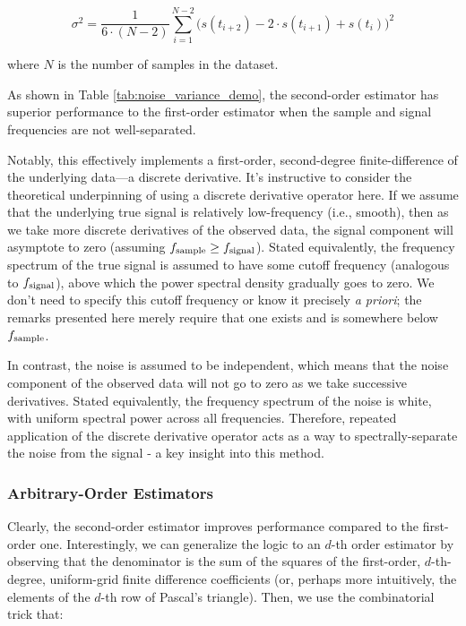 \documentclass[conf]{new-aiaa}
\begin{document}
    \begin{equation}
        \sigma^2 = \frac{1}{6 \cdot (N-2)} \sum_{i=1}^{N-2} \Big( s(t_{i+2}) - 2 \cdot s(t_{i+1}) + s(t_i) \Big)^2
        \label{eq:2nd_order_noise_estimator}
    \end{equation}

    \noindent where $N$ is the number of samples in the dataset.

    As shown in Table \ref{tab:noise_variance_demo}, the second-order estimator has superior performance to the first-order estimator when the sample and signal frequencies are not well-separated.

    Notably, this effectively implements a first-order, second-degree finite-difference of the underlying data—a discrete derivative. It's instructive to consider the theoretical underpinning of using a discrete derivative operator here. If we assume that the underlying true signal is relatively low-frequency (i.e., smooth), then as we take more discrete derivatives of the observed data, the signal component will asymptote to zero (assuming $f_{\rm sample} \geq f_{\rm signal}$). Stated equivalently, the frequency spectrum of the true signal is assumed to have some cutoff frequency (analogous to $f_{\rm signal}$), above which the power spectral density gradually goes to zero. We don't need to specify this cutoff frequency or know it precisely \emph{a priori}; the remarks presented here merely require that one exists and is somewhere below $f_{\rm sample}$.

    In contrast, the noise is assumed to be independent, which means that the noise component of the observed data will not go to zero as we take successive derivatives. Stated equivalently, the frequency spectrum of the noise is white, with uniform spectral power across all frequencies. Therefore, repeated application of the discrete derivative operator acts as a way to spectrally-separate the noise from the signal - a key insight into this method.

    \subsubsection{Arbitrary-Order Estimators}

    Clearly, the second-order estimator improves performance compared to the first-order one. Interestingly, we can generalize the logic to an $d$-th order estimator by observing that the denominator is the sum of the squares of the first-order, $d$-th-degree, uniform-grid finite difference coefficients (or, perhaps more intuitively, the elements of the $d$-th row of Pascal's triangle). Then, we use the combinatorial trick that:
\end{document}
